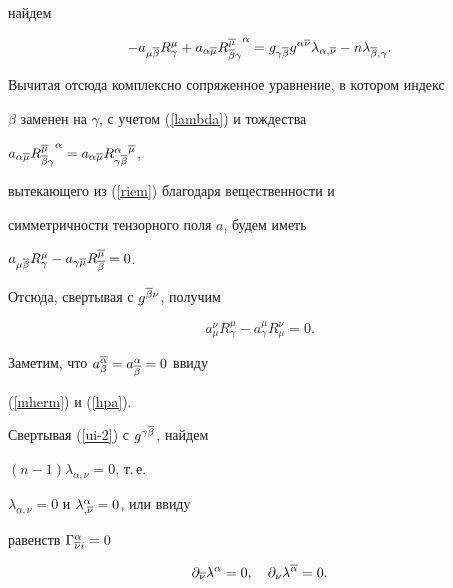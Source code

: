 найдем


$$


- a_{\mu\ol\beta} R^{\mu}_{\gamma}+


a_{\alpha\ol\mu}{R^{\ol\mu}_{\ol\beta\gamma}}^{\alpha}=


g_{\gamma\ol\beta} g^{\alpha\ol\nu} \lambda_{\alpha,\ol\nu}-


n \lambda_{\ol\beta,\gamma}.


$$


Вычитая отсюда комплексно сопряженное уравнение, в котором индекс


$\beta$ заменен на $\gamma$, с учетом (\ref{lambda}) и тождества


$ a_{\alpha\ol\mu} {R^{\ol\mu}_{\ol\beta\gamma}}^{\alpha}=


a_{\alpha\ol\mu} {R^{\alpha}_{\gamma\ol\beta}}^{\ol\mu}$,


вытекающего из (\ref{riem}) благодаря вещественности и


симметричности тензорного поля $a$, будем иметь


$a_{\mu\ol\beta} R^{\mu}_{\gamma}-


a_{\gamma\ol\mu} R^{\ol\mu}_{\ol\beta}=0$.


Отсюда, свертывая с $g^{\overline\beta\nu}$, получим


\begin{equation}


\label{zvez}


a_{\mu}^{\nu} R^{\mu}_{\gamma}-


a_{\gamma}^{\mu} R^{\nu}_{\mu}=0.


\end{equation}


Заметим, что $a^{\overline\alpha}_{\beta} = a^\alpha_{\overline\beta}=0$ ввиду


(\ref{mherm}) и (\ref{hpa}).


Свертывая (\ref{ui-2}) с $g^{\gamma\overline\beta}$, найдем


$(n-1)\lambda_{\alpha,\nu} =0$, т.\,е.


$\lambda_{\alpha,\nu} =0$ и $\lambda^{\alpha}_{,\overline\nu} =0$, или ввиду


равенств $\Gamma^\alpha_{\overline\nu i} =0$


\begin{equation}


\label{hol-lam}


\partial_{\ol\nu} \lambda^{\alpha} =0, \quad \partial_{\nu}


\lambda^{\ol\alpha} =0.


\end{equation}


